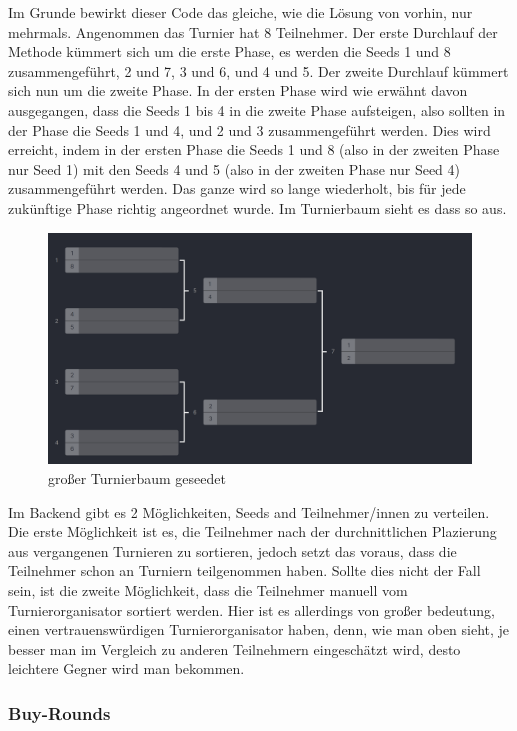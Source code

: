 Im Grunde bewirkt dieser Code das gleiche, wie die Lösung von vorhin, nur mehrmals.
Angenommen das Turnier hat 8 Teilnehmer.
Der erste Durchlauf der Methode kümmert sich um die erste Phase, es werden die Seeds 1 und 8 zusammengeführt, 2 und 7, 3 und 6, und 4 und 5.
Der zweite Durchlauf kümmert sich nun um die zweite Phase. In der ersten Phase wird wie erwähnt davon ausgegangen, dass die Seeds 1 bis 4 in die zweite 
Phase aufsteigen, also sollten in der Phase die Seeds 1 und 4, und 2 und 3 zusammengeführt werden.
Dies wird erreicht, indem in der ersten Phase die Seeds 1 und 8 (also in der zweiten Phase nur Seed 1) mit den 
Seeds 4 und 5 (also in der zweiten Phase nur Seed 4) zusammengeführt werden. Das ganze wird so lange wiederholt, bis für jede zukünftige Phase richtig 
angeordnet wurde. Im Turnierbaum sieht es dass so aus.

\begin{figure}[H]
    \includegraphics[scale=0.25]{pics/backend/elimination/elimination_tree_seeded_big.png}
    \caption{großer Turnierbaum geseedet\cite{implementation-execution-1}}
\end{figure}

Im Backend gibt es 2 Möglichkeiten, Seeds and Teilnehmer/innen zu verteilen. Die erste Möglichkeit ist es, die Teilnehmer nach der durchnittlichen Plazierung aus vergangenen Turnieren zu sortieren, 
jedoch setzt das voraus, dass die Teilnehmer schon an Turniern teilgenommen haben. Sollte dies nicht der Fall sein, ist die zweite Möglichkeit, dass die Teilnehmer manuell vom Turnierorganisator sortiert werden.
Hier ist es allerdings von großer bedeutung, einen vertrauenswürdigen Turnierorganisator haben, denn, wie man oben sieht, je besser man im Vergleich zu anderen Teilnehmern eingeschätzt wird, desto leichtere Gegner wird man bekommen.

\subsubsection{Buy-Rounds}

